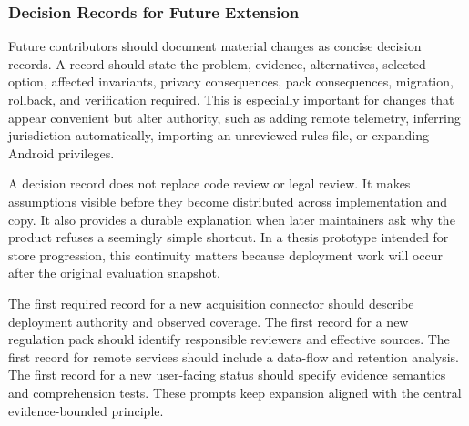 \subsubsection{Decision Records for Future Extension}

Future contributors should document material changes as concise decision records. A record should state the problem, evidence, alternatives, selected option, affected invariants, privacy consequences, pack consequences, migration, rollback, and verification required. This is especially important for changes that appear convenient but alter authority, such as adding remote telemetry, inferring jurisdiction automatically, importing an unreviewed rules file, or expanding Android privileges.

A decision record does not replace code review or legal review. It makes assumptions visible before they become distributed across implementation and copy. It also provides a durable explanation when later maintainers ask why the product refuses a seemingly simple shortcut. In a thesis prototype intended for store progression, this continuity matters because deployment work will occur after the original evaluation snapshot.

The first required record for a new acquisition connector should describe deployment authority and observed coverage. The first record for a new regulation pack should identify responsible reviewers and effective sources. The first record for remote services should include a data-flow and retention analysis. The first record for a new user-facing status should specify evidence semantics and comprehension tests. These prompts keep expansion aligned with the central evidence-bounded principle.
